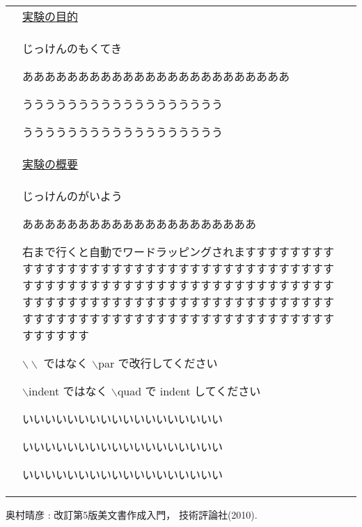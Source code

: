 \documentclass[10pt]{ltjsarticle}
\begin{document}
\endgroup
\vspace{-16pt}
\begingroup
\begin{center}
\renewcommand{\arraystretch}{1}
\begin{tabular}{|p{.9cm}p{13.9435cm}p{1.1cm}|}
  &\large 
  \hspace{-.6em}\underline{実験の目的}
  & \\
  &
  \quad じっけんのもくてき \par ああああああああああああああああああああああああ
  \par うううううううううううううううううう
  \par うううううううううううううううううう
  \vspace{.6em}
  & \\
  &\large 
  \hspace{-.6em}\underline{実験の概要}
  & \\
  &
  \quad じっけんのがいよう \par あああああああああああああああああああああ
  \par 右まで行くと自動でワードラッピングされますすすすすすすすすすすすすすすすすすすすすすすすすすすすすすすすすすすすすすすすすすすすすすすすすすすすすすすすすすすすすすすすすすすすすすすすすすすすすすすすすすすすすすすすすすすすすすすすすすすすすすすすすすすすすすすすすすすすすすすすすすすすすす
  \par $\backslash\backslash$ ではなく $\backslash$par で改行してください
  \par $\backslash$indent ではなく $\backslash$quad で indent してください
  \par いいいいいいいいいいいいいいいいいい
  \par いいいいいいいいいいいいいいいいいい
  \par いいいいいいいいいいいいいいいいいい
  \vspace{1.2em}
  & \\
  \hline
\end{tabular}
\end{center}
\endgroup


\begin{thebibliography}{10}

奥村晴彦 : 改訂第5版\LaTeXe 美文書作成入門，
技術評論社(2010).

\end{thebibliography}
\end{document}
